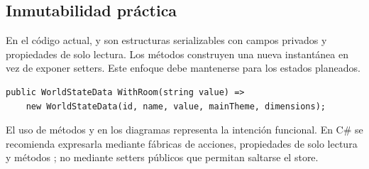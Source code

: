 \subsection{Inmutabilidad práctica}

En el código actual,  y  son estructuras serializables con campos privados y propiedades de solo lectura. Los métodos  construyen una nueva instantánea en vez de exponer setters. Este enfoque debe mantenerse para los estados planeados.

\begin{lstlisting}[caption={Forma recomendada de producir una nueva instantánea},label={lst:with-pattern}]
public WorldStateData WithRoom(string value) =>
    new WorldStateData(id, name, value, mainTheme, dimensions);
\end{lstlisting}

El uso de métodos  y  en los diagramas representa la intención funcional. En C\# se recomienda expresarla mediante fábricas de acciones, propiedades de solo lectura y métodos ; no mediante setters públicos que permitan saltarse el store.
